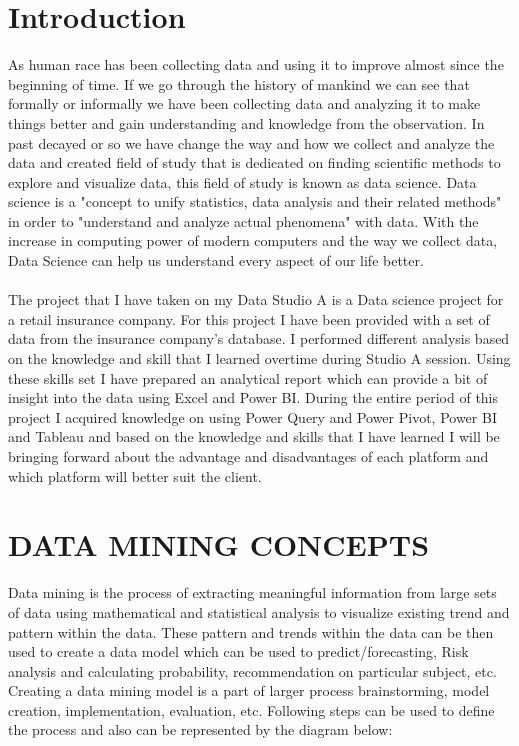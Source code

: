 \documentclass{article}
\begin{document}
\section{Introduction}\label{sec:intor}
	As human race has been collecting data and using it to improve almost since the beginning of time. If we go through the history of mankind we can see that formally or informally we have been collecting data and analyzing it to make things better and gain understanding and knowledge from the observation. In past decayed or so we have change the way and how we collect and analyze the data and created field of study that is dedicated on finding scientific methods to explore and visualize data, this field of study is known as data science. Data science is a "concept to unify statistics, data analysis and their related methods" in order to "understand and analyze actual phenomena" with data. With the increase in computing power of modern computers and the way we collect data, Data Science can help us understand every aspect of our life better.\\\\
The project that I have taken on my Data Studio A is a Data science project for a retail insurance company. For this project I have been provided with a set of data from the insurance company’s database. I performed different analysis based on the knowledge and skill that I learned overtime during Studio A session. Using these skills set I have prepared an analytical report which can provide a bit of insight into the data using Excel and Power BI. During the entire period of this project I acquired knowledge on using Power Query and Power Pivot, Power BI and Tableau and based on the knowledge and skills that I have learned I will be bringing forward about the advantage and disadvantages of each platform and which platform will better suit the client.\hfill \pagebreak
\section{DATA MINING CONCEPTS}\label{SEC:background}
Data mining is the process of extracting meaningful information from large sets of data using mathematical and statistical analysis to visualize existing trend and pattern within the data. These pattern and trends within the data can be then used to create a data model which can be used to predict/forecasting, Risk analysis and calculating probability, recommendation on particular subject, etc. Creating a data mining model is a part of larger process brainstorming, model creation, implementation, evaluation, etc. Following steps can be used to define the process and also can be represented by the diagram below:\\
\end{document}
